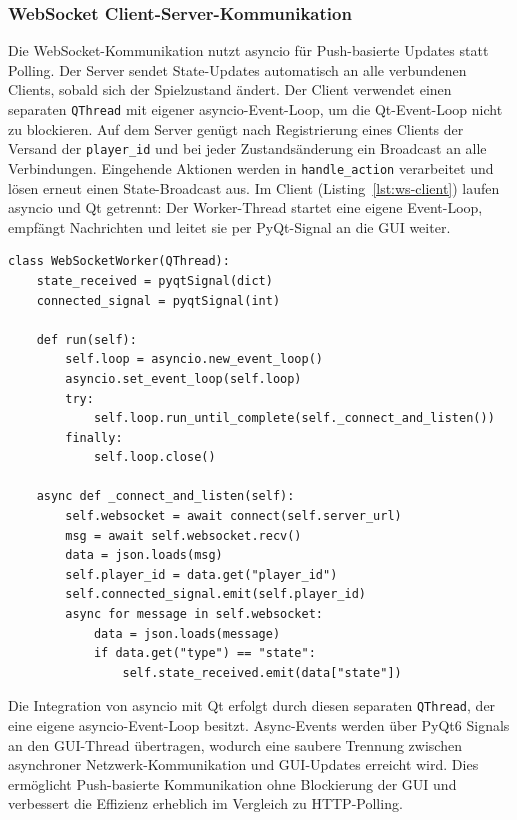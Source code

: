 \subsubsection{WebSocket Client-Server-Kommunikation}

Die WebSocket-Kommunikation nutzt asyncio für Push-basierte Updates statt Polling.
Der Server sendet State-Updates automatisch an alle verbundenen Clients, sobald sich der Spielzustand ändert.
Der Client verwendet einen separaten \texttt{QThread} mit eigener asyncio-Event-Loop, um die Qt-Event-Loop nicht zu blockieren.
Auf dem Server genügt nach Registrierung eines Clients der Versand der \texttt{player\_id} und bei jeder Zustandsänderung ein Broadcast an alle Verbindungen. Eingehende Aktionen werden in \texttt{handle\_action} verarbeitet und lösen erneut einen State-Broadcast aus.
Im Client (Listing~\ref{lst:ws-client}) laufen asyncio und Qt getrennt: Der Worker-Thread startet eine eigene Event-Loop, empfängt Nachrichten und leitet sie per PyQt-Signal an die GUI weiter.

\begin{lstlisting}[caption={WebSocket-Client: QThread mit asyncio-Event-Loop}]
class WebSocketWorker(QThread):
    state_received = pyqtSignal(dict)
    connected_signal = pyqtSignal(int)

    def run(self):
        self.loop = asyncio.new_event_loop()
        asyncio.set_event_loop(self.loop)
        try:
            self.loop.run_until_complete(self._connect_and_listen())
        finally:
            self.loop.close()

    async def _connect_and_listen(self):
        self.websocket = await connect(self.server_url)
        msg = await self.websocket.recv()
        data = json.loads(msg)
        self.player_id = data.get("player_id")
        self.connected_signal.emit(self.player_id)
        async for message in self.websocket:
            data = json.loads(message)
            if data.get("type") == "state":
                self.state_received.emit(data["state"])
\end{lstlisting}\label{lst:ws-client}

Die Integration von asyncio mit Qt erfolgt durch diesen separaten \texttt{QThread}, der eine eigene asyncio-Event-Loop besitzt.
Async-Events werden über PyQt6 Signals an den GUI-Thread übertragen, wodurch eine saubere Trennung zwischen asynchroner Netzwerk-Kommunikation und GUI-Updates erreicht wird.
Dies ermöglicht Push-basierte Kommunikation ohne Blockierung der GUI und verbessert die Effizienz erheblich im Vergleich zu HTTP-Polling.

